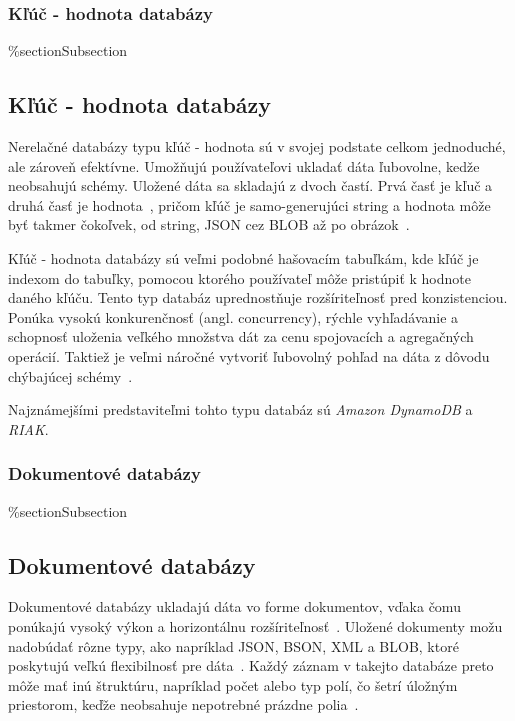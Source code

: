 %
%
{
	\subsubsection{Kľúč - hodnota databázy}
}
{
	\%section{Subsection}
	\subsection{Kľúč - hodnota databázy}
}
\label{subsubsection:key_value_db}
Nerelačné databázy typu kľúč - hodnota sú v svojej podstate celkom jednoduché, ale zároveň efektívne. Umožňujú používateľovi ukladať dáta ľubovolne, kedže neobsahujú schémy. Uložené dáta sa skladajú z dvoch častí. Prvá časť je kľuč a druhá časť je hodnota~\cite{NoSQLDBvsRealtionDB}, pričom kľúč je samo-generujúci string a hodnota môže byť takmer čokoľvek, od string, JSON cez BLOB až po obrázok~\cite{MongoDBvsMySQL2015}.

Kľúč - hodnota databázy sú veľmi podobné hašovacím tabuľkám, kde kľúč je indexom do tabuľky, pomocou ktorého používateľ môže pristúpiť k hodnote daného kľúču. Tento typ databáz uprednostňuje rozšíriteľnosť pred konzistenciou. Ponúka vysokú konkurenčnosť (angl. concurrency), rýchle vyhľadávanie a schopnosť uloženia veľkého množstva dát za cenu spojovacích a agregačných operácií. Taktiež je veľmi náročné vytvoriť ľubovolný pohľad na dáta z dôvodu chýbajúcej schémy~\cite{NoSQLDBvsRealtionDB}.

Najznámejšími predstaviteľmi tohto typu databáz sú \textit{Amazon DynamoDB} a \textit{RIAK}.

%
%
{
	\subsubsection{Dokumentové databázy}
}
{
	\%section{Subsection}
	\subsection{Dokumentové databázy}
}
\label{subsubsection:document_db}
Dokumentové databázy ukladajú dáta vo forme dokumentov, vďaka čomu ponúkajú vysoký výkon a horizontálnu rozšíriteľnosť~\cite{NoSQLDBvsRealtionDB}. Uložené dokumenty možu nadobúdať rôzne typy, ako napríklad JSON, BSON, XML a BLOB, ktoré poskytujú veľkú flexibilnosť pre dáta~\cite{MongoDBvsMySQLCompared}. Každý záznam v takejto databáze preto môže mať inú štruktúru, napríklad počet alebo typ polí, čo šetrí úložným priestorom, keďže neobsahuje nepotrebné prázdne polia~\cite{NoSQLDBvsRealtionDB}.

